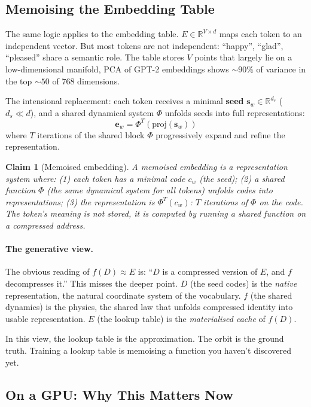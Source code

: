 \documentclass[11pt, a4paper]{article}
\newcommand{\s}{\mathbf{s}}
\newcommand{\R}{\mathbb{R}}
\newtheorem{claim}{Claim}
\theoremstyle{remark}
\begin{document}
\subsection{Memoising the Embedding Table}

The same logic applies to the embedding table.
$E \in \R^{V \times d}$ maps each token to an independent vector.
But most tokens are not independent: ``happy'', ``glad'', ``pleased'' share a semantic role.
The table stores $V$ points that largely lie on a low-dimensional manifold, PCA of GPT-2 embeddings shows ${\sim}90\%$ of variance in the top ${\sim}50$ of 768 dimensions.

The intensional replacement: each token receives a minimal \textbf{seed} $\s_w \in \R^{d_s}$ ($d_s \ll d$), and a shared dynamical system $\Phi$ unfolds seeds into full representations:
\begin{equation}
    \mathbf{e}_w = \Phi^T(\text{proj}(\s_w))
\end{equation}
where $T$ iterations of the shared block $\Phi$ progressively expand and refine the representation.

\begin{claim}[Memoised embedding]
A memoised embedding is a representation system where:
(1) each token has a minimal code $c_w$ (the seed);
(2) a shared function $\Phi$ (the same dynamical system for all tokens) unfolds codes into representations;
(3) the representation is $\Phi^T(c_w)$: $T$ iterations of $\Phi$ on the code.
The token's meaning is not stored, it is computed by running a shared function on a compressed address.
\end{claim}

\paragraph{The generative view.}
The obvious reading of $f(D) \approx E$ is: ``$D$ is a compressed version of $E$, and $f$ decompresses it.''
This misses the deeper point.
$D$ (the seed codes) is the \emph{native} representation, the natural coordinate system of the vocabulary.
$f$ (the shared dynamics) is the physics, the shared law that unfolds compressed identity into usable representation.
$E$ (the lookup table) is the \emph{materialised cache} of $f(D)$.

In this view, the lookup table is the approximation.
The orbit is the ground truth.
Training a lookup table is memoising a function you haven't discovered yet.

\subsection{On a GPU: Why This Matters Now}
\end{document}
